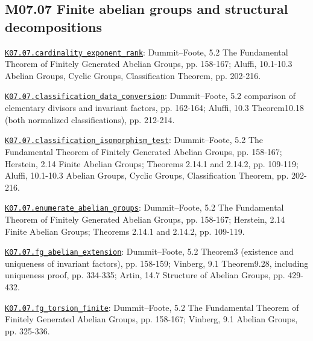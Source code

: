 \subsection*{M07.07 Finite abelian groups and structural decompositions}
\par\smallskip\noindent\hypertarget{src:K07.07.cardinality_exponent_rank}{}\label{src:K07.07.cardinality_exponent_rank}\hyperref[K07.07.cardinality_exponent_rank]{\texttt{K07.07.cardinality\_exponent\_rank}}: Dummit--Foote, 5.2 The Fundamental Theorem of Finitely Generated Abelian Groups, pp. 158-167; Aluffi, 10.1-10.3 Abelian Groups, Cyclic Groups, Classification Theorem, pp. 202-216.
\par\smallskip\noindent\hypertarget{src:K07.07.classification_data_conversion}{}\label{src:K07.07.classification_data_conversion}\hyperref[K07.07.classification_data_conversion]{\texttt{K07.07.classification\_data\_conversion}}: Dummit--Foote, 5.2 comparison of elementary divisors and invariant factors, pp. 162-164; Aluffi, 10.3 Theorem10.18 (both normalized classifications), pp. 212-214.
\par\smallskip\noindent\hypertarget{src:K07.07.classification_isomorphism_test}{}\label{src:K07.07.classification_isomorphism_test}\hyperref[K07.07.classification_isomorphism_test]{\texttt{K07.07.classification\_isomorphism\_test}}: Dummit--Foote, 5.2 The Fundamental Theorem of Finitely Generated Abelian Groups, pp. 158-167; Herstein, 2.14 Finite Abelian Groups; Theorems 2.14.1 and 2.14.2, pp. 109-119; Aluffi, 10.1-10.3 Abelian Groups, Cyclic Groups, Classification Theorem, pp. 202-216.
\par\smallskip\noindent\hypertarget{src:K07.07.enumerate_abelian_groups}{}\label{src:K07.07.enumerate_abelian_groups}\hyperref[K07.07.enumerate_abelian_groups]{\texttt{K07.07.enumerate\_abelian\_groups}}: Dummit--Foote, 5.2 The Fundamental Theorem of Finitely Generated Abelian Groups, pp. 158-167; Herstein, 2.14 Finite Abelian Groups; Theorems 2.14.1 and 2.14.2, pp. 109-119.
\par\smallskip\noindent\hypertarget{src:K07.07.fg_abelian_extension}{}\label{src:K07.07.fg_abelian_extension}\hyperref[K07.07.fg_abelian_extension]{\texttt{K07.07.fg\_abelian\_extension}}: Dummit--Foote, 5.2 Theorem3 (existence and uniqueness of invariant factors), pp. 158-159; Vinberg, 9.1 Theorem9.28, including uniqueness proof, pp. 334-335; Artin, 14.7 Structure of Abelian Groups, pp. 429-432.
\par\smallskip\noindent\hypertarget{src:K07.07.fg_torsion_finite}{}\label{src:K07.07.fg_torsion_finite}\hyperref[K07.07.fg_torsion_finite]{\texttt{K07.07.fg\_torsion\_finite}}: Dummit--Foote, 5.2 The Fundamental Theorem of Finitely Generated Abelian Groups, pp. 158-167; Vinberg, 9.1 Abelian Groups, pp. 325-336.
